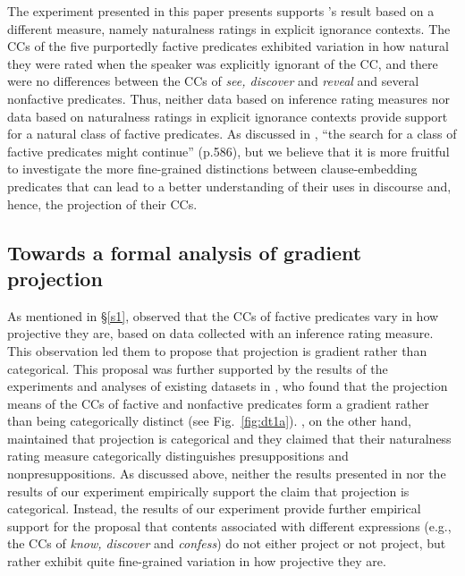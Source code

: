 \documentclass[11pt,fleqn]{article}
\newcommand{\6}{\mbox{$[\hspace*{-.6mm}[$}}
\newcommand{\9}{\mbox{$]\hspace*{-.6mm}]$}}
\newcommand{\citepos}[1]{\citeauthor{#1}'s \citeyear{#1}}
\begin{document}
The experiment presented in this paper presents supports \citepos{degen-tonhauser-language} result based on a different measure, namely naturalness ratings in explicit ignorance contexts. The CCs of the five purportedly factive predicates exhibited variation in how natural they were rated when the speaker was explicitly ignorant of the CC, and there were no differences between the CCs of {\em see, discover} and {\em reveal} and several nonfactive predicates. Thus, neither data based on inference rating measures nor data based on naturalness ratings in explicit ignorance contexts provide support for a natural class of factive predicates. As discussed in \citealt{degen-tonhauser-language}, ``the search for a class of factive predicates might continue'' (p.586), but we believe that it is more fruitful to investigate the more fine-grained distinctions between clause-embedding predicates that can lead to a better understanding of their uses in discourse and, hence, the projection of their CCs.

\subsection{Towards a formal analysis of gradient projection}

As mentioned in \S\ref{s1}, \citealt{tbd-variability} observed that the CCs of factive predicates vary in how projective they are,  based on data collected with an inference rating measure. This observation led them to propose that projection is gradient rather than categorical. This proposal was further supported by the results of the experiments and analyses of existing datasets in \citealt{degen-tonhauser-language}, who found that the projection means of the CCs of factive and nonfactive predicates form a gradient rather than being categorically distinct (see Fig.~\ref{fig:dt1a}). \citealt{mandelkern-etal2020}, on the other hand, maintained that projection is categorical and  they claimed that  their naturalness rating measure categorically distinguishes presuppositions and nonpresuppositions.  As discussed above, neither the results presented in \citealt{mandelkern-etal2020} nor the results of our experiment empirically support the claim that projection is categorical. Instead, the results of our experiment provide further empirical support for the proposal that contents associated with different expressions (e.g., the CCs of {\em know, discover} and {\em confess}) do not either project or not project, but rather exhibit quite fine-grained variation in how projective they are.
\end{document}
